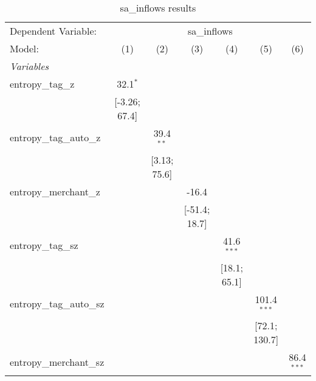 
\begin{table}[htbp]
   \centering
   \tiny
   \begin{threeparttable}[b]
      \caption{\label{tab:reg_sa_inflows_full.tex} sa\_inflows results}
      \begin{tabular}{lcccccc}
         \tabularnewline \midrule \midrule
         Dependent Variable: & \multicolumn{6}{c}{sa\_inflows}\\
         Model:                    & (1)              & (2)              & (3)              & (4)              & (5)              & (6)\\  
         \midrule
         \emph{Variables}\\
         entropy\_tag\_z           & 32.1$^{*}$       &                  &                  &                  &                  &   \\   
                                   & [-3.26; 67.4]    &                  &                  &                  &                  &   \\   
         entropy\_tag\_auto\_z     &                  & 39.4$^{**}$      &                  &                  &                  &   \\   
                                   &                  & [3.13; 75.6]     &                  &                  &                  &   \\   
         entropy\_merchant\_z      &                  &                  & -16.4            &                  &                  &   \\   
                                   &                  &                  & [-51.4; 18.7]    &                  &                  &   \\   
         entropy\_tag\_sz          &                  &                  &                  & 41.6$^{***}$     &                  &   \\   
                                   &                  &                  &                  & [18.1; 65.1]     &                  &   \\   
         entropy\_tag\_auto\_sz    &                  &                  &                  &                  & 101.4$^{***}$    &   \\   
                                   &                  &                  &                  &                  & [72.1; 130.7]    &   \\   
         entropy\_merchant\_sz     &                  &                  &                  &                  &                  & 86.4$^{***}$\\   

\end{tabular}
\end{threeparttable}
\end{table}
